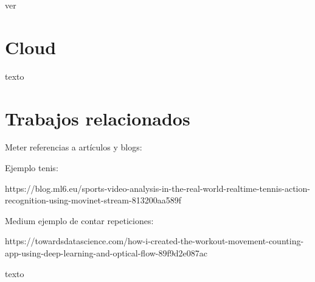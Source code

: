ver \cite{UCF101}


\section{Cloud}

texto

\section{Trabajos relacionados}

Meter referencias a artículos y blogs:

Ejemplo tenis:

https://blog.ml6.eu/sports-video-analysis-in-the-real-world-realtime-tennis-action-recognition-using-movinet-stream-813200aa589f

Medium ejemplo de contar repeticiones:

https://towardsdatascience.com/how-i-created-the-workout-movement-counting-app-using-deep-learning-and-optical-flow-89f9d2e087ac

texto
